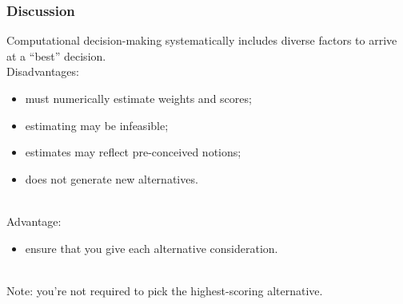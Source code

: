 \begin{frame}
\frametitle{Discussion}

\begin{changemargin}{2em}
Computational decision-making systematically includes diverse factors
to arrive at a ``best'' decision.\\[1em]

Disadvantages:
\begin{itemize}
\item must numerically estimate weights and scores;
\item estimating may be infeasible;
\item estimates may reflect pre-conceived notions;
\item does not generate new alternatives.
\end{itemize}~\\

Advantage:
\begin{itemize}
\item ensure that you give each alternative consideration.
\end{itemize}~\\

Note: you're not required to pick the highest-scoring alternative.

\end{changemargin}
\end{frame}




